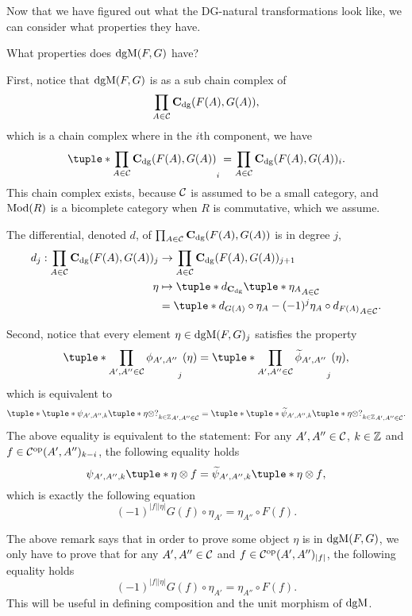 Now that we have figured out what the DG-natural transformations look like, we can consider what properties they have.

\begin{remark}
    What properties does \( \operatorname{dgM}(F, G) \) have?

    First, notice that \( \operatorname{dgM}(F, G) \) is as a sub chain complex of
    \[
        \prod_{A \in {\mathcal{C}}} \operatorname{\mathbf{C}}_{\operatorname{dg}}(F(A), G(A)),
    \]
    which is a chain complex where in the \( i \)th component, we have
    \[
        \tuple*{ \prod_{A \in \Cc} \C_{\dg}(F(A), G(A)) }_i = \prod_{A \in \Cc} \C_{\dg}(F(A), G(A))_i.
    \]
    This chain complex exists, because \( {\mathcal{C}} \) is assumed to be a small category, and \( \operatorname{Mod}(R) \) is a bicomplete category when \( R \) is commutative, which we assume.

    The differential, denoted \( d \), of \( \prod_{A \in {\mathcal{C}}} \operatorname{\mathbf{C}}_{\operatorname{dg}}(F(A), G(A)) \) is in degree \( j \),
    \begin{align*}
        d_j: \prod_{A \in \Cc} \C_{\dg}(F(A), G(A))_j &\to \prod_{A \in \Cc} \C_{\dg}(F(A), G(A))_{j + 1} \\
        \eta &\mapsto \tuple*{ d_{\C_{\dg}}\tuple*{ \eta_A } }_{A \in \Cc} \\
        &= \tuple*{ d_{G(A)} \circ \eta_A - (-1)^j \eta_A \circ d_{F(A)} }_{A \in \Cc}.
    \end{align*}

    Second, notice that every element \( \eta \in \operatorname{dgM}(F, G)_j \) satisfies the property
    \[
        \tuple*{ \prod\limits_{A', A'' \in \Cc} \phi_{A', A''} }_j (\eta) = \tuple*{ \prod_{A', A'' \in \Cc} \widetilde{\phi}_{A', A''} }_j (\eta),
    \]
    which is equivalent to
    \[
        \tuple*{ \tuple*{ \psi_{A', A'', k}\tuple*{ \eta \otimes ? } }_{k \in \Zb} }_{A', A'' \in \Cc} = \tuple*{ \tuple*{ \widetilde{\psi}_{A', A'', k}\tuple*{ \eta \otimes ? } }_{k \in \Zb} }_{A', A'' \in \Cc}.
    \]
    The above equality is equivalent to the statement: For any \( A', A'' \in {\mathcal{C}} \), \( k \in {\mathbb{Z}} \) and \( f \in {\mathcal{C}}^{\operatorname{op}}(A', A'')_{k - i} \), the following equality holds
    \[
        \psi_{A', A'', k}\tuple*{ \eta \otimes f } = \widetilde{\psi}_{A', A'', k} \tuple*{ \eta \otimes f },
    \]
    which is exactly the following equation
    \[
        (-1)^{|f||\eta|}G(f) \circ \eta_{A'} = \eta_{A''} \circ F(f).
    \]
\end{remark}

The above remark says that in order to prove some object \( \eta \) is in \( \operatorname{dgM}(F, G) \), we only have to prove that for any \( A', A'' \in {\mathcal{C}} \) and \( f \in {\mathcal{C}}^{\operatorname{op}}(A', A'')_{|f|} \), the following equality holds
\[
        (-1)^{|f||\eta|}G(f) \circ \eta_{A'} = \eta_{A''} \circ F(f).
\]
This will be useful in defining composition and the unit morphism of \( \operatorname{dgM} \).

